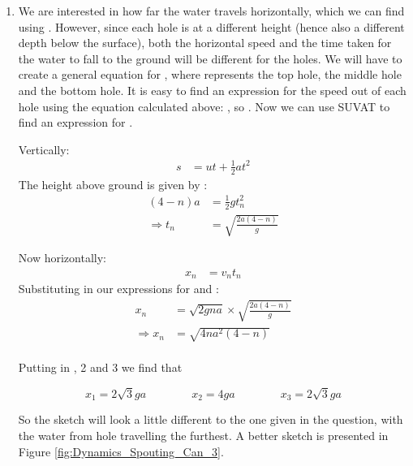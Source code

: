 \begin{problem}
{\begin{enumerate}
\item We are interested in how far the water travels horizontally, which we can find using . However, since each hole is at a different height (hence also a different depth below the surface), both the horizontal speed and the time taken for the water to fall to the ground will be different for the holes. We will have to create a general equation for , where  represents the top hole,  the middle hole and  the bottom hole. It is easy to find an expression for the speed out of each hole  using the equation calculated above: , so . Now we can use SUVAT to find an expression for .

Vertically:
\begin{eqnarray*}
 s&= ut + \frac{1}{2}at^{2}
\end{eqnarray*} 
The height above ground is given by :
\begin{eqnarray*}
\left(4-n\right)a&= \frac{1}{2}gt_{n}^{2} \\ 
\Rightarrow t_{n}&= \sqrt{\frac{2a\left(4-n\right)}{g}}
\end{eqnarray*}

Now horizontally:
\begin{eqnarray*} 
x_{n}&= v_{n}t_{n}
\end{eqnarray*}  
Substituting in our expressions for  and :
\begin{eqnarray*}
 x_{n}&= \sqrt{2gna}\times\sqrt{\frac{2a\left(4-n\right)}{g}} \\ 
\Rightarrow x_{n}&= \sqrt{4na^2\left(4-n\right)} \\ 
\end{eqnarray*}

Putting in , 2 and 3 we find that

\begin{equation*}
x_1 = 2\sqrt{3}ga \quad\quad\quad\quad x_2 = 4ga \quad\quad\quad\quad x_3 = 2\sqrt{3}ga
\end{equation*}

So the sketch will look a little different to the one given in the question, with the water from hole  travelling the furthest. A better sketch is presented in Figure \ref{fig:Dynamics_Spouting_Can_3}.


\end{enumerate}}
\end{problem}
